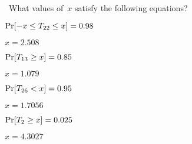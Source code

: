 \begin{problem}
  ~What values of~$x$ satisfy the following equations?
\end{problem}

\begin{subproblem}
  ${\Pr\lbrack-x \leq T_{22} \leq x\rbrack = 0.98}$
\end{subproblem}

$x = 2.508$

\begin{subproblem}
  ${\Pr\lbrack T_{13} \geq x\rbrack = 0.85}$
\end{subproblem}

$x = 1.079$

\begin{subproblem}
  ${\Pr\lbrack T_{26} < x\rbrack = 0.95}$
\end{subproblem}

$x = 1.7056$

\begin{subproblem}
  ${\Pr\lbrack T_{2} \geq x\rbrack = 0.025}$
\end{subproblem}

$x = 4.3027$
